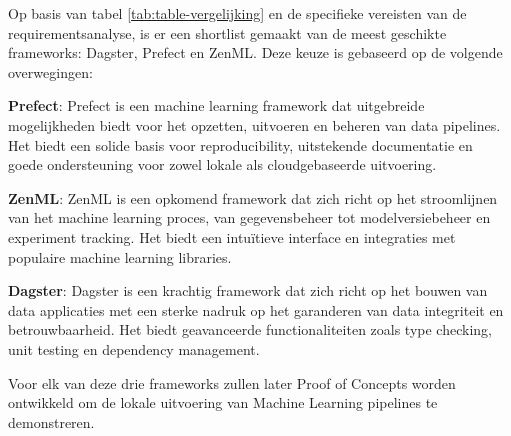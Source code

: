 Op basis van tabel \ref{tab:table-vergelijking} en de specifieke vereisten van de requirementsanalyse, is er een shortlist gemaakt van de meest geschikte frameworks: Dagster, Prefect en ZenML. Deze keuze is gebaseerd op de volgende overwegingen:

\textbf{Prefect}: Prefect is een machine learning framework dat uitgebreide mogelijkheden biedt voor het opzetten, uitvoeren en beheren van data pipelines. Het biedt een solide basis voor reproducibility, uitstekende documentatie en goede ondersteuning voor zowel lokale als cloudgebaseerde uitvoering.

\textbf{ZenML}: ZenML is een opkomend framework dat zich richt op het stroomlijnen van het machine learning proces, van gegevensbeheer tot modelversiebeheer en experiment tracking. Het biedt een intuïtieve interface en integraties met populaire machine learning libraries.

\textbf{Dagster}: Dagster is een krachtig framework dat zich richt op het bouwen van data applicaties met een sterke nadruk op het garanderen van data integriteit en betrouwbaarheid. Het biedt geavanceerde functionaliteiten zoals type checking, unit testing en dependency management.

Voor elk van deze drie frameworks zullen later Proof of Concepts worden ontwikkeld om de lokale uitvoering van Machine Learning pipelines te demonstreren.

